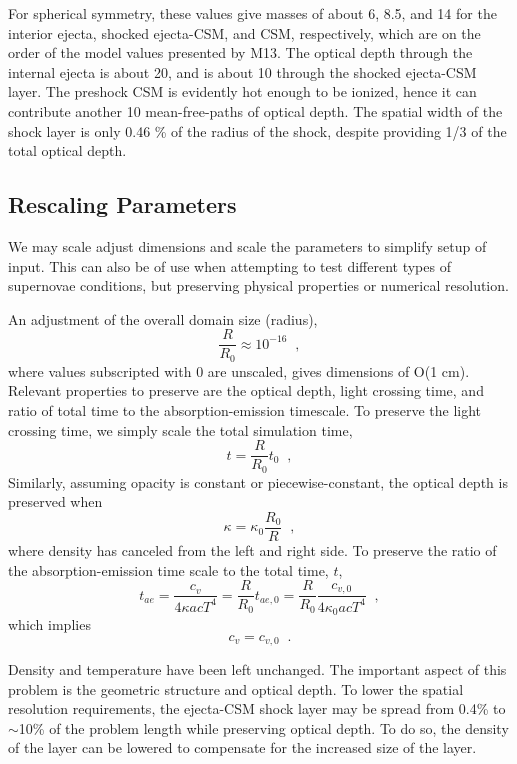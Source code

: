 \documentclass[]{article}
\begin{document}
		For spherical symmetry, these values give masses of about 6, 8.5, and 14 for the interior ejecta, shocked ejecta-CSM, and CSM, respectively, which are on the order of the model values presented by M13. The optical depth through the internal ejecta is about 20, and is about 10 through the shocked ejecta-CSM layer. The preshock CSM is evidently hot enough to be ionized, hence it can contribute another 10 mean-free-paths of optical depth. The spatial width of the shock layer is only 0.46 \% of the radius of the shock, despite providing 1/3 of the total optical depth.

	\subsection{Rescaling Parameters} \label{sec:rescaling}
		We may scale adjust dimensions and scale the parameters to simplify setup of input. This can also be of use when attempting to test different types of supernovae conditions, but preserving physical properties or numerical resolution.

		An adjustment of the overall domain size (radius),
		\begin{equation}
			\frac{R}{R_0} \approx 10^{-16} \;\;,
		\end{equation}
		where values subscripted with $0$ are unscaled, gives dimensions of O(1 cm). Relevant properties to preserve are the optical depth, light crossing time, and ratio of total time to the absorption-emission timescale. To preserve the light crossing time, we simply scale the total simulation time,
		\begin{equation}
			t = \frac{R}{R_0}t_0 \;\;,
		\end{equation}
		Similarly, assuming opacity is constant or piecewise-constant, the optical depth is preserved when
		\begin{equation}
			\kappa = \kappa_0\frac{R_0}{R} \;\;,
		\end{equation}
		where density has canceled from the left and right side. To preserve the ratio of the absorption-emission time scale to the total time, $t$,
		\begin{equation}
			t_{ae} = \frac{c_v}{4\kappa acT^4} = \frac{R}{R_0}t_{ae,0}
			= \frac{R}{R_0}\frac{c_{v,0}}{4\kappa_0 acT^4} \;\;,
		\end{equation}
		which implies
		\begin{equation}
			c_v = c_{v,0} \;\;.
		\end{equation}

		Density and temperature have been left unchanged. The important aspect of this problem is the geometric structure and optical depth. To lower the spatial resolution requirements, the ejecta-CSM shock layer may be spread from 0.4\% to $\sim$10\% of the problem length while preserving optical depth. To do so, the density of the layer can be lowered to compensate for the increased size of the layer.
\end{document}
